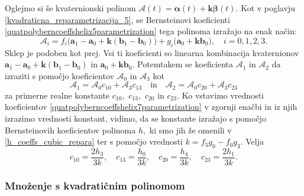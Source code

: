 \documentclass[12pt,a4paper,twoside]{article}
\theoremstyle{definition} %
\theoremstyle{plain} %
\theoremstyle{primerstyle}
\numberwithin{equation}{section}  %
\newcommand{\aV}{\mathbf{a}}
\newcommand{\bV}{\mathbf{b}}
\newcommand{\kV}{\mathbf{k}}
\newcommand{\AQ}{\mathcal{A}}
\newcommand{\balpha}{\boldsymbol \alpha}
\newcommand{\bbeta}{\boldsymbol \beta}
\begin{document}
Oglejmo si še kvaternionski polinom $\AQ(t)=\balpha(t)+\kV\bbeta(t).$ Kot v poglavju \ref{kvadraticna_reparametrizacija_5}, se Bernsteinovi koeficienti \eqref{quatpolyberncoeffshelix5parametrization} tega polinoma izražajo na enak način:
\begin{equation}
	\label{quatpolyberncoeffshelix7parametrization}
	\AQ_i=f_i\big(\aV_1-\aV_0+\kV(\bV_1-\bV_0)\big)+g_i\big(\aV_0+\kV\bV_0\big),\quad i=0,1,2,3.
\end{equation}
Sklep je podoben kot prej. Vsi ti koeficienti so linearna kombinacija kvaternionov $\aV_1-\aV_0+\kV(\bV_1-\bV_0)$ in $\aV_0+\kV\bV_0$. Potemtakem se koeficienta $\AQ_1$ in $\AQ_2$ da izraziti s pomočjo koeficientov $\AQ_0$ in $\AQ_3$ kot
\begin{equation*}
	\AQ_1=\AQ_0c_{10}+\AQ_3c_{13}\quad\text{in}\quad\AQ_2=\AQ_0c_{20}+\AQ_3c_{23}
\end{equation*}
za primerne realne konstante $c_{10},$ $c_{13},$ $c_{20}$ in $c_{23}.$ Ko vstavimo vrednosti koeficientov \eqref{quatpolyberncoeffshelix7parametrization} v zgornji enačbi in iz njih izrazimo vrednosti konstant, vidimo, da se konstante izražajo s pomočjo Bernsteinovih koeficientov polinoma $h,$ ki smo jih že omenili v \eqref{h_coeffs_cubic_repara} ter s pomočjo vrednosti $k=f_3g_0-f_0g_3.$ Velja
\begin{equation*}
	c_{10}=\frac{2h_3}{3k},\quad c_{13}=\frac{h_0}{3k},\quad c_{20}=\frac{h_4}{3k},\quad c_{23}=\frac{2h_1}{3k}.
\end{equation*}

\subsubsection{Množenje s kvadratičnim polinomom}
\label{mnozenje_kvadraticni_polinom_7}
\end{document}
